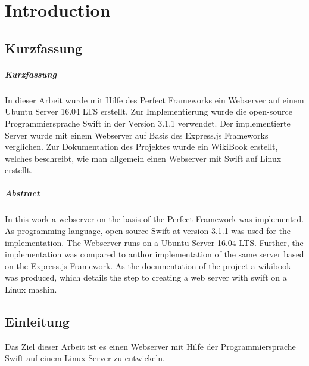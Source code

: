 ﻿%
\chapter{Introduction}\label{chap:introduction}
\chapterstart
\section{Kurzfassung}
\label{section:kurzfassung}
\paragraph{Kurzfassung}
In dieser Arbeit wurde mit Hilfe des Perfect Frameworks ein Webserver auf einem Ubuntu Server 16.04 LTS erstellt. Zur Implementierung wurde die open-source Programmiersprache Swift in der Version 3.1.1 verwendet. Der implementierte Server wurde mit einem Webserver auf Basis des Express.js Frameworks verglichen. Zur Dokumentation des Projektes wurde ein WikiBook erstellt, welches beschreibt, wie man allgemein einen Webserver mit Swift auf Linux erstellt.
\paragraph{Abstract}
In this work a webserver on the basis of the Perfect Framework was implemented. As programming language, open source Swift at version 3.1.1 was used for the implementation. The Webserver runs on a Ubuntu Server 16.04 LTS. Further, the implementation was compared to anthor implementation of the same server based on the Express.js Framework. As the documentation of the project a wikibook was produced, which details the step to creating a web server with swift on a Linux mashin. 
\section{Einleitung}
\label{sec:einleitung}
Das Ziel dieser Arbeit ist es einen Webserver mit Hilfe der Programmiersprache Swift auf einem Linux-Server zu entwickeln. 
